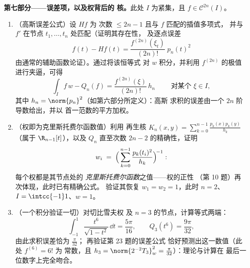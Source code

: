 \begin{problem}
\medskip
\noindent\textbf{第七部分——误差项，以及权背后的
核。}此处 $I$ 为紧集，且 $f \in \mathcal
C^{2n}(I)$。
\begin{enumerate}[resume]
  \item （高斯误差公式）设 $Hf$ 为
        次数 $\leq 2n - 1$ 且与 $f$ 匹配的插值多项式，
        并与 $f'$ 在节点 $t_1, \dots, t_n$ 处匹配（证明其存在性，
        及逐点误差
        \[
        f(t) - Hf(t) =
        \frac{f^{(2n)}(\xi_t)}{(2n)!}\;p_n(t)^2
        \]
        由通常的辅助函数论证）。通过将该恒等式
        对 $w$ 积分，并利用
        $f^{(2n)}$ 的极值进行夹逼，可得
        \[
        \int_I f\,w - Q_n(f)
        = \frac{f^{(2n)}(\xi)}{(2n)!}\,h_n
        \qquad\text{ 对某个 } \xi \in I,
        \]
        其中 $h_n = \norm{p_n}^2$（如第六部分所定义）：高斯
        求积的误差由一个 $2n$ 阶导数给出，并以
        首一范数的平方加权。
  \item （权即为克里斯托费尔函数值）利用
        再生核 $K_n(x, y) = \sum_{k=0}^{n-1}
        \frac{p_k(x)p_k(y)}{h_k}$（属于 $\R_{n-1}[t]$），以及
        $Q_n$ 直至次数 $2n - 2$ 的精确性，证明
        \[
        w_i \;=\;
        \Bigl(\,\sum_{k=0}^{n-1}
        \frac{p_k(t_i)^2}{h_k}\Bigr)^{\!-1} :
        \]
        每个权都是其节点处的
        \emph{克里斯托费尔函数}之值——权的正性
        （第 10 题）再次体现，此时已有精确公式。
        验证其恢复 $w_1 = w_2 = 1$，此时 $n =
        2$、$I = \intcc{-1}1$、$w = 1$。
  \item （一个积分验证一切）对切比雪夫权
        及 $n = 3$ 的节点，计算等式两端：
        \[
        \int_{-1}^{1}\frac{t^6}{\sqrt{1 - t^2}}\,\dd t
        = \frac{5\pi}{16},
        \qquad
        Q_3(t^6) = \frac{9\pi}{32},
        \]
        由此求积误差恰为 $\frac{\pi}{32}$；
        再验证第 23 题的误差公式
        恰好预测出这一数值（此处 $f^{(6)} = 6!$ 为
        常数，且 $h_3 = \norm{2^{-2}T_3}_w^2 =
        \frac\pi{32}$）：理论与计算在
        最后一位数字上完全吻合。
\end{enumerate}
\end{problem}

